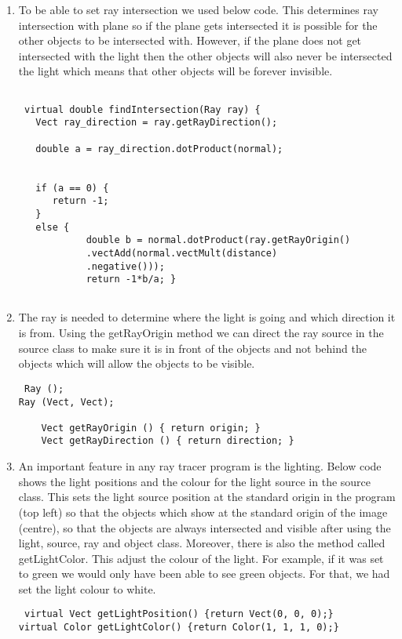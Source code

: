 \documentclass{article}
\begin{document}
\begin{enumerate}
\begin{lstlisting}
 \end{lstlisting}
 
 \item To be able to set ray intersection we used below code. This determines ray intersection with plane so if the plane gets intersected it is possible for the other objects to be intersected with. However, if the plane does not get intersected with the light then the other objects will also never be intersected the light which means that other objects will be forever invisible.
 
 \begin{lstlisting} 
 
 virtual double findIntersection(Ray ray) {
   Vect ray_direction = ray.getRayDirection();

   double a = ray_direction.dotProduct(normal); 
   

   if (a == 0) {
      return -1;
   }
   else {
            double b = normal.dotProduct(ray.getRayOrigin()
            .vectAdd(normal.vectMult(distance)
            .negative()));
            return -1*b/a; }
 
 \end{lstlisting}
 
 \item The ray is needed to determine where the light is going and which direction it is from. Using the getRayOrigin method we can direct the ray source in the source class to make sure it is in front of the objects and not behind the objects which will allow the  objects to be visible.
 
 \begin{lstlisting}
 Ray ();
Ray (Vect, Vect);

    Vect getRayOrigin () { return origin; }
    Vect getRayDirection () { return direction; }
 \end{lstlisting}
 
 \item 
 An important feature in any ray tracer program is the lighting. Below code shows the light positions and the colour for the light source in the source class. This sets the light source position at the standard origin in the program (top left) so that the objects which show at the standard origin of the image (centre), so that the objects are always intersected and visible after using the light, source, ray and object class. Moreover, there is also the method called getLightColor. This adjust the colour of the light. For example, if it was set to green we would only have been able to see green objects. For that, we had set the light colour to white.
 
 \begin{lstlisting}
 virtual Vect getLightPosition() {return Vect(0, 0, 0);}
virtual Color getLightColor() {return Color(1, 1, 1, 0);}
 \end{lstlisting}
 
\end{enumerate}
\end{document}
